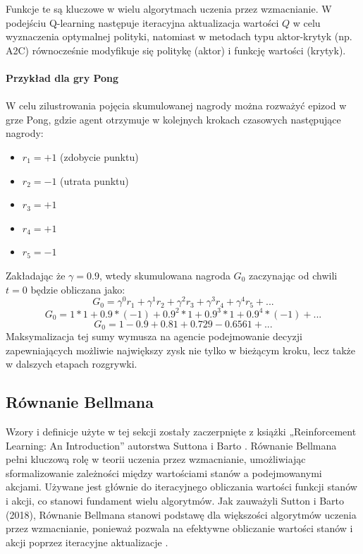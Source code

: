 \documentclass[a4paper, 12pt]{article}
\numberwithin{equation}{section}
\begin{document}
    Funkcje te są kluczowe w wielu algorytmach uczenia przez wzmacnianie. 
    W podejściu Q-learning następuje iteracyjna aktualizacja wartości \( Q \) w celu wyznaczenia optymalnej polityki,
    natomiast w metodach typu aktor-krytyk (np. A2C) równocześnie modyfikuje się politykę (aktor) i funkcję wartości (krytyk).
    \\ \\ 
    \textbf{Przykład dla gry Pong}
    \\ \\ 
    W celu zilustrowania pojęcia skumulowanej nagrody można rozważyć epizod w grze Pong, gdzie agent otrzymuje w kolejnych krokach czasowych następujące nagrody:    \begin{itemize}
        \item \( r_1 = +1 \) (zdobycie punktu)
        \item \( r_2 = -1 \) (utrata punktu)
        \item \( r_3 = +1 \)
        \item \( r_4 = +1 \)
        \item \( r_5 = -1 \)
    \end{itemize}
    Zakładając że \( \gamma = 0.9 \), wtedy skumulowana nagroda \( G_0 \) zaczynając od chwili \( t = 0 \) będzie obliczana jako:
    \[ G_0 = \gamma^0r_1 + \gamma^1r_2 + \gamma^2r_3 + \gamma^3r_4 + \gamma^4r_5 + ... \]
    \[ G_0 = 1 * 1 + 0.9 * (-1) + 0.9^2 * 1 + 0.9^3 * 1 + 0.9^4 * (-1) + ... \]
    \[ G_0 = 1 - 0.9 + 0.81 + 0.729 - 0.6561 + ... \]
    Maksymalizacja tej sumy wymusza na agencie podejmowanie decyzji zapewniających możliwie największy zysk nie tylko w bieżącym kroku, lecz także w dalszych etapach rozgrywki.
    \subsection{Równanie Bellmana}
    Wzory i definicje użyte w tej sekcji zostały zaczerpnięte z książki „Reinforcement Learning: An Introduction” autorstwa Suttona i Barto \cite{sutton2018rl}.
    Równanie Bellmana pełni kluczową rolę w teorii uczenia przez wzmacnianie, umożliwiając sformalizowanie zależności między wartościami stanów a podejmowanymi akcjami.
    Używane jest głównie do iteracyjnego obliczania wartości funkcji stanów i akcji, co stanowi fundament wielu algorytmów. 
    Jak zauważyli Sutton i Barto (2018), Równanie Bellmana stanowi podstawę dla większości algorytmów uczenia przez wzmacnianie, ponieważ pozwala na efektywne obliczanie wartości stanów i akcji poprzez iteracyjne aktualizacje \cite{sutton2018rl}.
\end{document}
